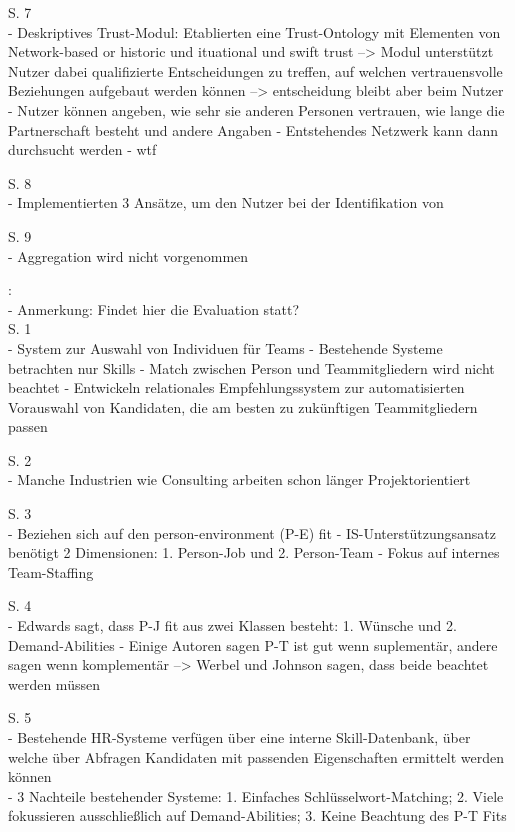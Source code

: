 S. 7\\
- Deskriptives Trust-Modul: Etablierten eine Trust-Ontology mit Elementen von Network-based or historic und ituational und swift trust --> Modul unterstützt Nutzer dabei qualifizierte Entscheidungen zu treffen, auf welchen vertrauensvolle Beziehungen aufgebaut werden können --> entscheidung bleibt aber beim Nutzer
- Nutzer können angeben, wie sehr sie anderen Personen vertrauen, wie lange die Partnerschaft besteht und andere Angaben
- Entstehendes Netzwerk kann dann durchsucht werden
- wtf

S. 8\\
- Implementierten 3 Ansätze, um den Nutzer bei der Identifikation von 

S. 9\\
- Aggregation wird nicht vorgenommen

\textcite{malinowski:2008}:\\
- Anmerkung: Findet hier die Evaluation statt?\\
S. 1\\
- System zur Auswahl von Individuen für Teams
- Bestehende Systeme betrachten nur Skills - Match zwischen Person und Teammitgliedern wird nicht beachtet
- Entwickeln relationales Empfehlungssystem zur automatisierten Vorauswahl von Kandidaten, die am besten zu zukünftigen Teammitgliedern passen

S. 2\\
- Manche Industrien wie Consulting arbeiten schon länger Projektorientiert

S. 3\\
- Beziehen sich auf den person-environment (P-E) fit
- IS-Unterstützungsansatz benötigt 2 Dimensionen: 1. Person-Job und 2. Person-Team
- Fokus auf internes Team-Staffing

S. 4\\
- Edwards sagt, dass P-J fit aus zwei Klassen besteht: 1. Wünsche und 2. Demand-Abilities
- Einige Autoren sagen P-T ist gut wenn suplementär, andere sagen wenn komplementär --> Werbel und Johnson sagen, dass beide beachtet werden müssen

S. 5\\
- Bestehende HR-Systeme verfügen über eine interne Skill-Datenbank, über welche über Abfragen Kandidaten mit passenden Eigenschaften ermittelt werden können\\
- 3 Nachteile bestehender Systeme: 1. Einfaches Schlüsselwort-Matching; 2. Viele fokussieren ausschließlich auf Demand-Abilities; 3. Keine Beachtung des P-T Fits

